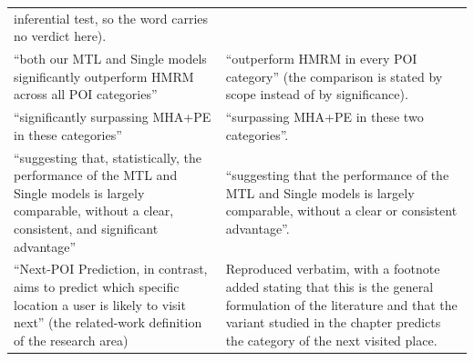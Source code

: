 \begin{table}[htb]
\begin{tabular}{@{}p{}p{}@{}}
inferential test, so the word carries no verdict here). \\
``both our MTL and Single models significantly outperform HMRM across all POI
categories'' &
``outperform HMRM in every POI category'' (the comparison is stated by scope instead of
by significance). \\
``significantly surpassing MHA+PE in these categories'' &
``surpassing MHA+PE in these two categories''. \\
``suggesting that, statistically, the performance of the MTL and Single models is
largely comparable, without a clear, consistent, and significant advantage'' &
``suggesting that the performance of the MTL and Single models is largely comparable,
without a clear or consistent advantage''. \\
\addlinespace
``Next-POI Prediction, in contrast, aims to predict which specific location a user is
likely to visit next'' (the related-work definition of the research area) &
Reproduced verbatim, with a footnote added stating that this is the general formulation
of the literature and that the variant studied in the chapter predicts the category of
the next visited place. \\
\bottomrule
\end{tabular}
\end{table}
